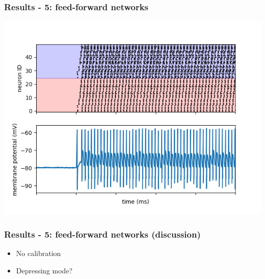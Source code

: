 \documentclass{beamer}
\begin{document}
\begin{frame}
    \frametitle{Results - 5: feed-forward networks}
    \includegraphics[width=\textwidth]{figures/feedforward signals loop.png}
\end{frame}

\begin{frame}
    \frametitle{Results - 5: feed-forward networks (discussion)}
    \begin{itemize}
        \item No calibration
        \item Depressing mode?
    \end{itemize}
\end{frame}
\end{document}
